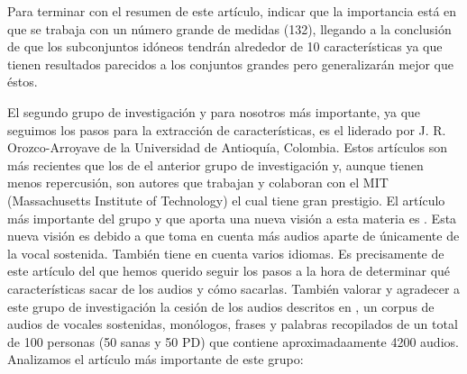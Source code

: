 \begin{itemize}
	Para terminar con el resumen de este artículo, indicar que la importancia está en que se trabaja con un número grande de medidas (132), llegando a la conclusión de que los subconjuntos idóneos tendrán alrededor de 10 características ya que tienen resultados parecidos a los conjuntos grandes pero generalizarán mejor que éstos.
	
\end{itemize}

El segundo grupo de investigación y para nosotros más importante, ya que seguimos los pasos para la extracción de características, es el liderado por J. R. Orozco-Arroyave de la Universidad de Antioquía, Colombia. Estos artículos son más recientes que los de el anterior grupo de investigación y, aunque tienen menos repercusión, son autores que trabajan y colaboran con el MIT (Massachusetts Institute of Technology) el cual tiene gran prestigio. El artículo más importante del grupo y que aporta una nueva visión a esta materia es \cite{Orz2016}. Esta nueva visión es debido a que toma en cuenta más audios aparte de únicamente de la vocal sostenida. También tiene en cuenta varios idiomas. Es precisamente de este artículo del que hemos querido seguir los pasos a la hora de determinar qué características sacar de los audios y cómo sacarlas. También valorar y agradecer a este grupo de investigación la cesión de los audios descritos en \cite{OrzCorpus}, un corpus de audios de vocales sostenidas, monólogos, frases y palabras recopilados de un total de 100 personas (50 sanas y 50 PD) que contiene aproximadaamente 4200 audios. Analizamos el artículo más importante de este grupo:
